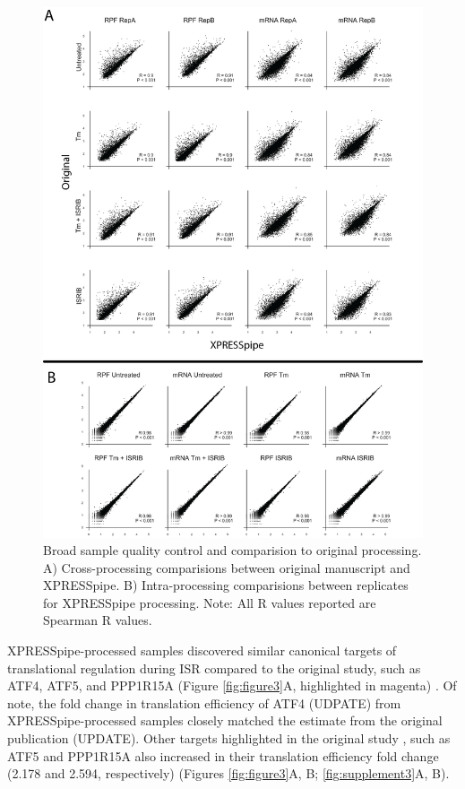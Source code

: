 \documentclass[11pt, a4paper, oneside]{article}
\begin{document}
\begin{figure}
\centering
  \includegraphics[width=160mm]{figures/xpresspipe_figure2.png}
  \caption{Broad sample quality control and comparision to original processing. A) Cross-processing comparisions between original manuscript and XPRESSpipe. B) Intra-processing comparisions between replicates for XPRESSpipe processing. Note: All R values reported are Spearman R values.}
  \label{fig:figure2}
\end{figure}

XPRESSpipe-processed samples discovered similar canonical targets of translational regulation during ISR compared to the original study, such as ATF4, ATF5, and PPP1R15A (Figure \ref{fig:figure3}A, highlighted in magenta) \cite{isrib_riboseq}. Of note, the fold change in translation efficiency of ATF4 (UDPATE) from XPRESSpipe-processed samples closely matched the estimate from the original publication (UPDATE). Other targets highlighted in the original study \cite{isrib_riboseq}, such as ATF5 and PPP1R15A also increased in their  translation efficiency fold change (2.178 and 2.594, respectively) (Figures \ref{fig:figure3}A, B; \ref{fig:supplement3}A, B).  \par
\end{document}
